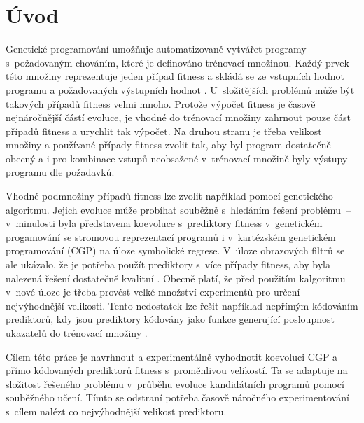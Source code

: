 \documentclass[czech]{ExcelAtFIT} %
\affiliation{*%
    \href{mailto:xwigla00@stud.fit.vutbr.cz}{xwigla00@stud.fit.vutbr.cz},
    \textit{Fakulta informačních technologií, Vysoké učení technické v~Brně}}
\begin{document}
\startdocument



\section{Úvod}

Genetické programování umožňuje automatizovaně vytvářet programy s~požadovaným chováním, které je definováno trénovací množinou. Každý prvek této množiny reprezentuje jeden případ fitness a skládá se ze vstupních hodnot programu a po\-ža\-do\-va\-ných vý\-stup\-ních hodnot \cite{HandbookGP}. U~složitějších problémů může být ta\-ko\-vých případů fitness velmi mnoho. Protože vý\-po\-čet fitness je časově nejnáročnější částí evoluce, je vhodné do trénovací množiny zahrnout pouze část případů fitness a urychlit tak výpočet. Na druhou stranu je třeba velikost množiny a používané případy fitness zvolit tak, aby byl program dostatečně obecný a i pro kombinace vstupů neobsažené v~trénovací množině byly výstupy programu dle požadavků.

Vhodné podmnožiny případů fitness lze zvolit na\-příklad pomocí genetického algoritmu. Jejich evoluce může probíhat souběžně s~hledáním řešení prob\-lému~-- v~minulosti byla představena ko\-evo\-luce s~pre\-dik\-tory fitness v~genetickém progamování se stromovou re\-pre\-zen\-tací programů \cite{Schmidt} i v~kartézském genetickém pro\-gra\-mo\-vání (CGP) \cite{SikuEuroGP} na úloze symbolické regrese. V~úloze obrazových filtrů se ale ukázalo, že je potřeba použít prediktory s~více případy fitness, aby byla na\-le\-zená řešení dostatečně kvalitní \cite{SikuPPSN}. Obecně platí, že před použitím kalgoritmu v~nové úloze je třeba provést velké množství experimentů pro určení nejvýhodnější velikosti. Tento nedostatek lze řešit například nepřímým kódováním prediktorů, kdy jsou prediktory kódovány jako funkce generující posloupnost uka\-za\-telů do trénovací množiny \cite{SikuHulva}.

Cílem této práce je navrhnout a experimentálně vyhodnotit koevoluci CGP a přímo kódovaných prediktorů fitness s~proměnlivou velikostí. Ta se adaptuje na složitost řešeného problému v~průběhu evoluce kandidátních programů pomocí souběžného učení. Tímto se odstraní potřeba časově náročného experimentování s~cílem nalézt co nejvýhodnější velikost prediktoru.
\end{document}
